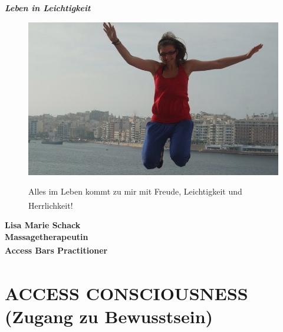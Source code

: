 \documentclass[10pt,foldmark,notumble]{leaflet}
\begin{document}
\centerline {\LARGE {\bf \it {Leben in Leichtigkeit}}}

\vspace*{30mm}
\begin{figure}[h] %
\begin{center}
 
 \includegraphics [scale=.30]{Lisa_Sprung_neu.JPG}
 
 \large  Alles im Leben kommt zu mir mit Freude, Leichtigkeit und Herrlichkeit!\textsuperscript{\textregistered} %
 \end{center}
\end{figure}

\begin{center}
{\LARGE \bf {Lisa Marie Schack}}\\
\vspace*{1mm}
\large \bf {Massagetherapeutin} \\ 
\vspace*{1mm}
\large {\bf {Access Bars Practitioner} \textsuperscript{\textregistered}} \\

\end{center}


\newpage

\section{ACCESS CONSCIOUSNESS \textsuperscript{\textregistered}\\
(Zugang zu Bewusstsein)}
\end{document}

